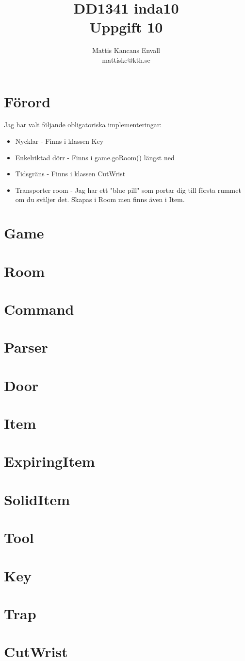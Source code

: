 \documentclass[a4paper]{article}
\author{Mattis Kancans Envall \\ mattiske@kth.se}
\title{DD1341 inda10 \\ Uppgift 10}
\begin{document}
	\maketitle
	\section{Förord}
Jag har valt följande obligatoriska implementeringar:
\begin{itemize}
	\item{Nycklar - Finns i klassen Key}
	\item{Enkelriktad dörr - Finns i game.goRoom() längst ned}
	\item{Tidsgräns - Finns i klassen CutWrist}
	\item{Transporter room - Jag har ett "blue pill" som portar dig till första rummet om du sväljer det. Skapas i Room men finns även i Item.}
\end{itemize}
	\tableofcontents
\section{Game}

\section{Room}
\section{Command}
\section{Parser}
\section{Door}
\section{Item}
\section{ExpiringItem}
\section{SolidItem}
\section{Tool}
\section{Key}
\section{Trap}
\section{CutWrist}
\end{document}

